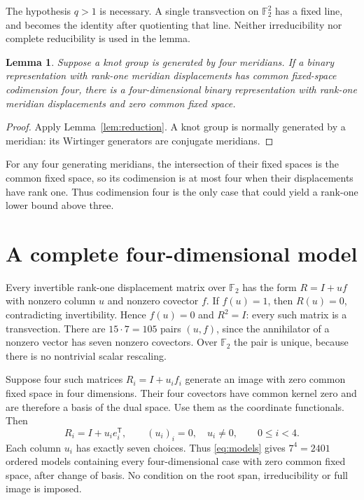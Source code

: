\documentclass[11pt]{article}
\newtheorem{lemma}{Lemma}
\newcommand{\F}{\mathbb F}
\begin{document}
The hypothesis $q>1$ is necessary. A single transvection on $\F_2^2$
has a fixed line, and becomes the identity after quotienting that
line. Neither irreducibility nor complete reducibility is used in
the lemma.

\begin{lemma}\label{lem:four}
Suppose a knot group is generated by four meridians. If a binary
representation with rank-one meridian displacements has common
fixed-space codimension four, there is a four-dimensional binary
representation with rank-one meridian displacements and zero
common fixed space.
\end{lemma}
\begin{proof}
Apply Lemma~\ref{lem:reduction}. A knot group is normally generated
by a meridian: its Wirtinger generators are conjugate meridians.
\end{proof}

For any four generating meridians, the intersection of their fixed
spaces is the common fixed space, so its codimension is at most
four when their displacements have rank one. Thus codimension four
is the only case that could yield a rank-one lower bound above three.

\section{A complete four-dimensional model}

Every invertible rank-one displacement matrix over $\F_2$ has the
form $R=I+uf$ with nonzero column $u$ and nonzero covector $f$.
If $f(u)=1$, then $R(u)=0$, contradicting invertibility.
Hence $f(u)=0$ and $R^2=I$: every such matrix is a transvection.
There are $15\cdot7=105$ pairs $(u,f)$, since the annihilator of
a nonzero vector has seven nonzero covectors. Over $\F_2$ the pair
is unique, because there is no nontrivial scalar rescaling.

Suppose four such matrices $R_i=I+u_if_i$ generate an image with
zero common fixed space in four dimensions. Their four covectors
have common kernel zero and are therefore a basis of the dual space.
Use them as the coordinate functionals. Then
\begin{equation}\label{eq:models}
               R_i=I+u_i e_i^{\mathsf T},\qquad
               (u_i)_i=0,\quad u_i\ne0,\qquad 0\le i<4.
\end{equation}
Each column $u_i$ has exactly seven choices. Thus \eqref{eq:models}
gives $7^4=2401$ ordered models containing every four-dimensional
case with zero common fixed space, after change of basis.
No condition on the root span, irreducibility or full image is imposed.
\end{document}
